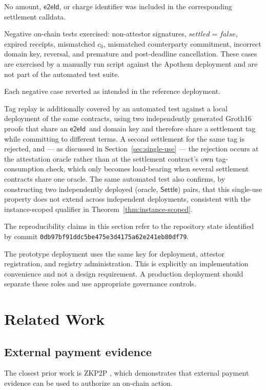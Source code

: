 \documentclass[10pt,twocolumn]{article}
\newcommand{\eeid}{\ensuremath{\mathsf{e2eId}}}
\newcommand{\code}[1]{\texttt{#1}}
\newcommand{\Settle}{\ensuremath{\mathsf{Settle}}}
\begin{document}
No amount, \eeid, or charge identifier was included in the corresponding
settlement calldata.

Negative on-chain tests exercised: non-attestor signatures,
$\mathit{settled}=\mathit{false}$, expired receipts, mismatched $c_0$,
mismatched counterparty commitment, incorrect domain key, reversal, and
premature and post-deadline cancellation. These cases are exercised by a
manually run script against the Apothem deployment and are not part of
the automated test suite.

Each negative case reverted as intended in the reference deployment.

Tag replay is additionally covered by an automated test against a local
deployment of the same contracts, using two independently generated
Groth16 proofs that share an \eeid\ and domain key and therefore share a
settlement tag while committing to different terms. A second settlement
for the same tag is rejected, and --- as discussed in
Section~\ref{sec:single-use} --- the rejection occurs at the attestation
oracle rather than at the settlement contract's own tag-consumption
check, which only becomes load-bearing when several settlement contracts
share one oracle. The same automated test also confirms, by constructing
two independently deployed (oracle, \Settle) pairs, that this single-use
property does not extend across independent deployments, consistent with
the instance-scoped qualifier in Theorem~\ref{thm:instance-scoped}.

The reproducibility claims in this section refer to the repository state
identified by commit \code{0db97bf91ddc5be475e3d4175a62e241eb80df79}.

The prototype deployment uses the same key for deployment, attestor
registration, and registry administration. This is explicitly an
implementation convenience and not a design requirement. A production
deployment should separate these roles and use appropriate governance
controls.

\section{Related Work}
\label{sec:related}

\subsection{External payment evidence}

The closest prior work is ZKP2P \cite{zkp2p}, which demonstrates that
external payment evidence can be used to authorize an on-chain action.
\end{document}
